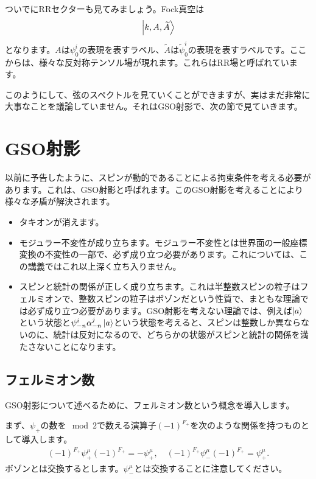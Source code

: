 \documentclass[report,paper=a4, fontsize=12pt, line_length=16cm, number_of_lines=33,dvipdfmx]{jlreq}
\numberwithin{equation}{chapter}
\numberwithin{equation}{section}
\newcommand{\At}{\widetilde{A}}
\newcommand{\psit}{\tilde{\psi}}
\begin{document}
ついでにRRセクターも見てみましょう。Fock真空は
\begin{align}
  \ket{k,A,\At}
\end{align}
となります。$A$は$\psi^{i}_{0}$の表現を表すラベル、$\At$は$\psit^{i}_{0}$の表現を表すラベルです。ここからは、様々な反対称テンソル場が現れます。これらはRR場と呼ばれています。

このようにして、弦のスペクトルを見ていくことができますが、実はまだ非常に大事なことを議論していません。それはGSO射影で、次の節で見ていきます。

\section{GSO射影}

以前に予告したように、スピンが動的であることによる拘束条件を考える必要があります。これは、GSO射影と呼ばれます。このGSO射影を考えることにより様々な矛盾が解決されます。
\begin{itemize}
  \item タキオンが消えます。
  \item モジュラー不変性が成り立ちます。モジュラー不変性とは世界面の一般座標変換の不変性の一部で、必ず成り立つ必要があります。これについては、この講義ではこれ以上深く立ち入りません。
  \item スピンと統計の関係が正しく成り立ちます。これは半整数スピンの粒子はフェルミオンで、整数スピンの粒子はボゾンだという性質で、まともな理論では必ず成り立つ必要があります。GSO射影を考えない理論では、例えば$\ket{a}$という状態と$\psi_{-n}^{i}\alpha_{-n}^{j}\ket{a}$という状態を考えると、スピンは整数しか異ならないのに、統計は反対になるので、どちらかの状態がスピンと統計の関係を満たさないことになります。
\end{itemize}

\subsection{フェルミオン数}
GSO射影について述べるために、フェルミオン数という概念を導入します。

まず、$\psi_{+}$の数を$\mod 2$で数える演算子$(-1)^{F_+}$を次のような関係を持つものとして導入します。
\begin{align}
  (-1)^{F_+}\psi_{+}^{\mu}(-1)^{F_+}=-\psi_{+}^{\mu},\quad
  (-1)^{F_+}\psi_{-}^{\mu}(-1)^{F_+}=\psi_{+}^{\mu}.
\end{align}
ボゾンとは交換するとします。$\psi^{\mu}_{-}$とは交換することに注意してください。
\end{document}
